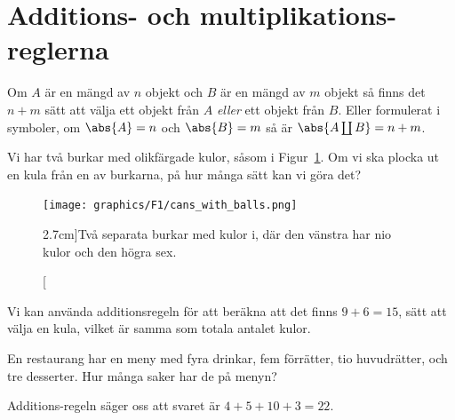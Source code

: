 \documentclass{tufte-handout}
\begin{document}
\section{Additions- och multiplikations-reglerna}

\begin{definition}
	Om $A$ är en mängd av $n$ objekt och $B$ är en mängd av $m$ objekt så finns det $n+m$ sätt att välja ett objekt från $A$ \emph{eller} ett objekt från $B$. Eller formulerat i symboler, om $\abs{A} = n$ och $\abs{B} = m$ så är $\abs{A \coprod B} = n + m$.
\end{definition}

\begin{example}\label{example_addition_rule_with_cans}
    Vi har två burkar med olikfärgade kulor, såsom i Figur~\ref{fig:two_cans_of_balls}. Om vi ska plocka ut en kula från en av burkarna, på hur många sätt kan vi göra det?
\begin{figure}[h]
	\centering
    \texttt{[image: graphics/F1/cans\_with\_balls.png]}
	\caption[][2.7cm]{Två separata burkar med kulor i, där den vänstra har nio kulor och den högra sex.}
	\label{fig:two_cans_of_balls}
\end{figure}

    Vi kan använda additionsregeln för att beräkna att det finns $9+6=15$, sätt att välja en kula, vilket är samma som totala antalet kulor.
\end{example}

\begin{example}\label{example_addition_rule}
	En restaurang har en meny med fyra drinkar, fem förrätter, tio huvudrätter, och tre desserter. Hur många saker har de på menyn?

	Additions-regeln säger oss att svaret är $4+5+10+3 = 22$.
\end{example}
\end{document}
